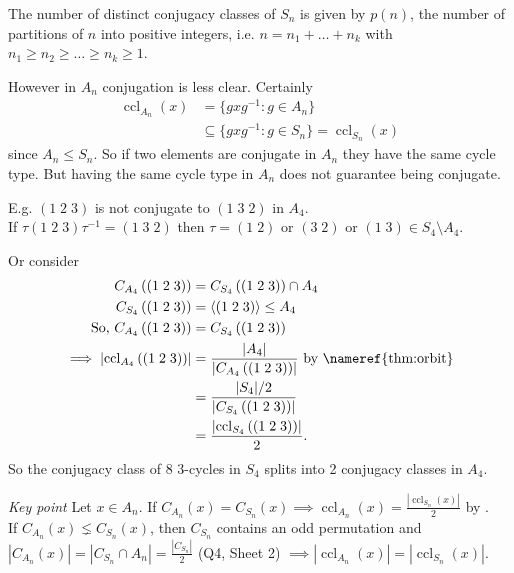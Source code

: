 \begin{corollary} \label{cor:6}
    The number of distinct conjugacy classes of $S_n$ is given by $p(n)$, the number of partitions of $n$ into positive integers, i.e. $n = n_1 + \dots + n_k$ with $n_1 \geq n_2 \geq \dots \geq n_k \geq 1$.
\end{corollary} 

However in $A_n$ conjugation is less clear. 
Certainly \begin{align*}
    \operatorname{ccl}_{A_n}(x) &= \{g x g^{-1} : g \in A_n\} \\
    &\subseteq \{g x g^{-1} : g \in S_n\} = \operatorname{ccl}_{S_n}(x)
\end{align*} since $A_n \leq S_n$.
So if two elements are conjugate in $A_n$ they have the same cycle type. 
But having the same cycle type in $A_n$ does not guarantee being conjugate.

E.g. $(1\; 2\; 3)$ is not conjugate to $(1\; 3\; 2)$ in $A_4$.\\
If $\tau (1\; 2\; 3) \tau^{-1} = (1\; 3\; 2)$ then $\tau = (1\; 2)$ or $(3\; 2)$ or $(1\; 3) \in S_4 \setminus A_4$.

Or consider 
\begin{align*}
    C_{A_4} \left( (1\; 2\; 3) \right) &= C_{S_4} \left( (1\; 2\; 3) \right) \cap A_4 \\
    C_{S_4} \left( (1\; 2\; 3) \right) &= \langle (1\; 2\; 3) \rangle \leq A_4 \\
    \text{So, } C_{A_4} \left( (1\; 2\; 3) \right) &= C_{S_4} \left( (1\; 2\; 3) \right) \\
    \implies \left| \operatorname{ccl}_{A_4} \left( (1\; 2\; 3) \right) \right| &= \frac{|A_4|}{\left| C_{A_4} \left( (1\; 2\; 3) \right) \right|} \text{ by \nameref{thm:orbit}} \\
    &= \frac{|S_4| / 2}{\left| C_{S_4} \left( (1\; 2\; 3) \right) \right|} \\
    &= \frac{\left| \operatorname{ccl}_{S_4} \left( (1\; 2\; 3) \right) \right|}{2}.
\end{align*} 
So the conjugacy class of 8 $3$-cycles in $S_4$ splits into 2 conjugacy classes in $A_4$.

\emph{Key point} Let $x \in A_n$.
If $C_{A_n}(x) = C_{S_n}(x) \implies \operatorname{ccl}_{A_n}(x) = \frac{| \operatorname{ccl}_{S_n}(x) |}{2}$ by . \\
If $C_{A_n}(x) \lneq C_{S_n}(x)$, then $C_{S_n}$ contains an odd permutation and $|C_{A_n}(x)| = |C_{S_n} \cap A_n| = \frac{|C_{S_n}|}{2}$ (Q4, Sheet 2) $\implies |\operatorname{ccl}_{A_n}(x)| = |\operatorname{ccl}_{S_n}(x)|$.

